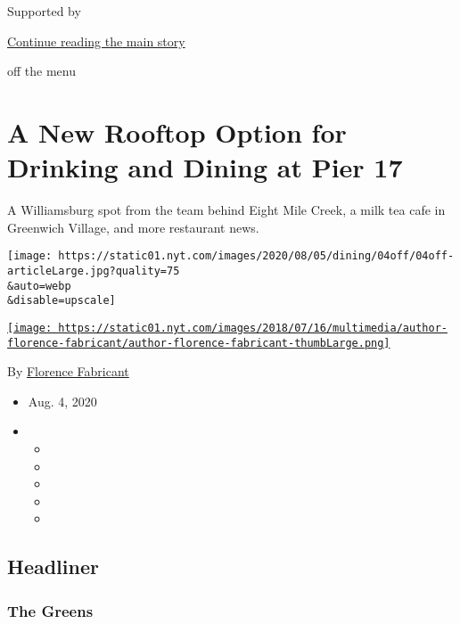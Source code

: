 Supported by

\protect\hyperlink{after-sponsor}{Continue reading the main story}

off the menu

\hypertarget{a-new-rooftop-option-for-drinking-and-dining-at-pier-17}{%
\section{A New Rooftop Option for Drinking and Dining at Pier
17}\label{a-new-rooftop-option-for-drinking-and-dining-at-pier-17}}

A Williamsburg spot from the team behind Eight Mile Creek, a milk tea
cafe in Greenwich Village, and more restaurant news.

\texttt{[image: https://static01.nyt.com/images/2020/08/05/dining/04off/04off-articleLarge.jpg?quality=75\\\&auto=webp\\\&disable=upscale]}

\href{https://www.nytimes.com/by/florence-fabricant}{\texttt{[image: https://static01.nyt.com/images/2018/07/16/multimedia/author-florence-fabricant/author-florence-fabricant-thumbLarge.png]}}

By \href{https://www.nytimes.com/by/florence-fabricant}{Florence
Fabricant}

\begin{itemize}
\item
  Aug. 4, 2020
\item
  \begin{itemize}
  \item
  \item
  \item
  \item
  \item
  \end{itemize}
\end{itemize}

\hypertarget{headliner}{%
\subsection{Headliner}\label{headliner}}

\hypertarget{the-greens}{%
\subsubsection{The Greens}\label{the-greens}}

